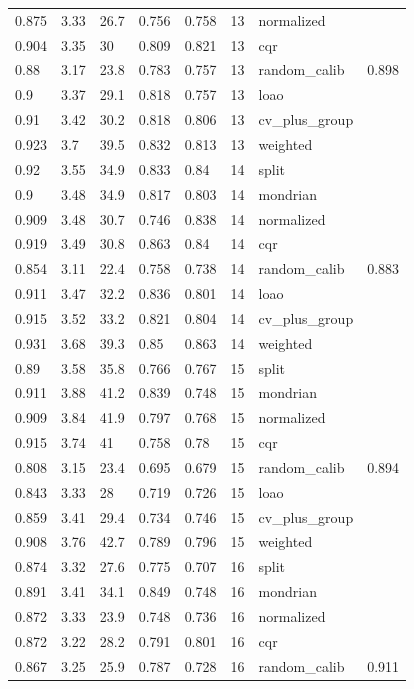 \begin{tabular}{llllllll}
0.875 & 3.33 & 26.7 & 0.756 & 0.758 & 13 & normalized &  \\
0.904 & 3.35 & 30 & 0.809 & 0.821 & 13 & cqr &  \\
0.88 & 3.17 & 23.8 & 0.783 & 0.757 & 13 & random\_calib & 0.898 \\
0.9 & 3.37 & 29.1 & 0.818 & 0.757 & 13 & loao &  \\
0.91 & 3.42 & 30.2 & 0.818 & 0.806 & 13 & cv\_plus\_group &  \\
0.923 & 3.7 & 39.5 & 0.832 & 0.813 & 13 & weighted &  \\
0.92 & 3.55 & 34.9 & 0.833 & 0.84 & 14 & split &  \\
0.9 & 3.48 & 34.9 & 0.817 & 0.803 & 14 & mondrian &  \\
0.909 & 3.48 & 30.7 & 0.746 & 0.838 & 14 & normalized &  \\
0.919 & 3.49 & 30.8 & 0.863 & 0.84 & 14 & cqr &  \\
0.854 & 3.11 & 22.4 & 0.758 & 0.738 & 14 & random\_calib & 0.883 \\
0.911 & 3.47 & 32.2 & 0.836 & 0.801 & 14 & loao &  \\
0.915 & 3.52 & 33.2 & 0.821 & 0.804 & 14 & cv\_plus\_group &  \\
0.931 & 3.68 & 39.3 & 0.85 & 0.863 & 14 & weighted &  \\
0.89 & 3.58 & 35.8 & 0.766 & 0.767 & 15 & split &  \\
0.911 & 3.88 & 41.2 & 0.839 & 0.748 & 15 & mondrian &  \\
0.909 & 3.84 & 41.9 & 0.797 & 0.768 & 15 & normalized &  \\
0.915 & 3.74 & 41 & 0.758 & 0.78 & 15 & cqr &  \\
0.808 & 3.15 & 23.4 & 0.695 & 0.679 & 15 & random\_calib & 0.894 \\
0.843 & 3.33 & 28 & 0.719 & 0.726 & 15 & loao &  \\
0.859 & 3.41 & 29.4 & 0.734 & 0.746 & 15 & cv\_plus\_group &  \\
0.908 & 3.76 & 42.7 & 0.789 & 0.796 & 15 & weighted &  \\
0.874 & 3.32 & 27.6 & 0.775 & 0.707 & 16 & split &  \\
0.891 & 3.41 & 34.1 & 0.849 & 0.748 & 16 & mondrian &  \\
0.872 & 3.33 & 23.9 & 0.748 & 0.736 & 16 & normalized &  \\
0.872 & 3.22 & 28.2 & 0.791 & 0.801 & 16 & cqr &  \\
0.867 & 3.25 & 25.9 & 0.787 & 0.728 & 16 & random\_calib & 0.911 \\

\end{tabular}
